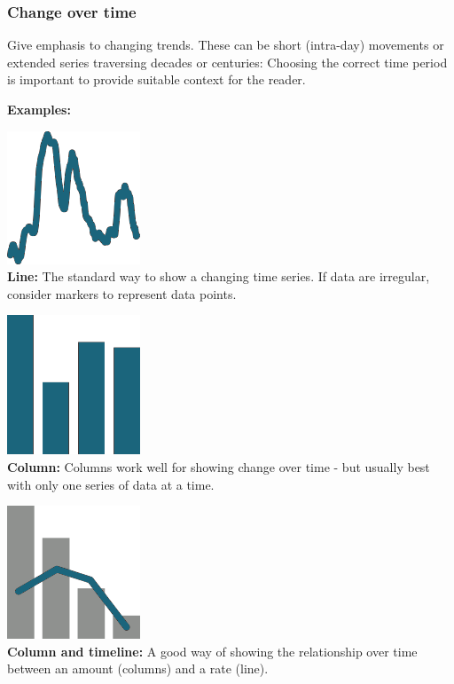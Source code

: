 \documentclass[
  a4paper,
  onecolumn,
  oneside]{book}
\begin{document}
\hypertarget{change-over-time}{%
\subsubsection{Change over time}\label{change-over-time}}

Give emphasis to changing trends. These can be short (intra-day)
movements or extended series traversing decades or centuries: Choosing
the correct time period is important to provide suitable context for the
reader.

\textbf{Examples:}

\includegraphics{part1/images/changeovertime1.png}\\
\textbf{Line:} The standard way to show a changing time series. If data
are irregular, consider markers to represent data points.

\includegraphics{part1/images/changeovertime2.png}\\
\textbf{Column:} Columns work well for showing change over time - but
usually best with only one series of data at a time.

\includegraphics{part1/images/changeovertime3.png}\\
\textbf{Column and timeline:} A good way of showing the relationship
over time between an amount (columns) and a rate (line).
\end{document}

